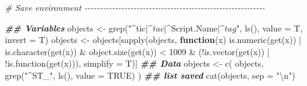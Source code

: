\documentclass[
  10pt,
  a4paper,oneside]{article}
\newenvironment{Shaded}{\begin{snugshade}}{\end{snugshade}}
\newcommand{\AttributeTok}[1]{\textcolor[rgb]{0.77,0.63,0.00}{#1}}
\newcommand{\CommentTok}[1]{\textcolor[rgb]{0.56,0.35,0.01}{\textit{#1}}}
\newcommand{\ConstantTok}[1]{\textcolor[rgb]{0.00,0.00,0.00}{#1}}
\newcommand{\ControlFlowTok}[1]{\textcolor[rgb]{0.13,0.29,0.53}{\textbf{#1}}}
\newcommand{\DecValTok}[1]{\textcolor[rgb]{0.00,0.00,0.81}{#1}}
\newcommand{\DocumentationTok}[1]{\textcolor[rgb]{0.56,0.35,0.01}{\textbf{\textit{#1}}}}
\newcommand{\FunctionTok}[1]{\textcolor[rgb]{0.00,0.00,0.00}{#1}}
\newcommand{\NormalTok}[1]{#1}
\newcommand{\OtherTok}[1]{\textcolor[rgb]{0.56,0.35,0.01}{#1}}
\newcommand{\SpecialCharTok}[1]{\textcolor[rgb]{0.00,0.00,0.00}{#1}}
\newcommand{\StringTok}[1]{\textcolor[rgb]{0.31,0.60,0.02}{#1}}
\begin{document}
\begin{Shaded}
\begin{Highlighting}[]
\CommentTok{\#  Save environment  {-}{-}{-}{-}{-}{-}{-}{-}{-}{-}{-}{-}{-}{-}{-}{-}{-}{-}{-}{-}{-}{-}{-}{-}{-}{-}{-}{-}{-}{-}{-}{-}{-}{-}{-}{-}{-}{-}{-}{-}{-}{-}{-}{-}{-}{-}{-}{-}{-}{-}{-}{-}{-}{-}{-}{-}{-}{-}{-}}

\DocumentationTok{\#\# Variables}
\NormalTok{objects }\OtherTok{\textless{}{-}} \FunctionTok{grep}\NormalTok{(}\StringTok{"\^{}tic$|\^{}tac$|\^{}Script.Name$|\^{}tag$"}\NormalTok{, }\FunctionTok{ls}\NormalTok{(), }\AttributeTok{value =}\NormalTok{ T, }\AttributeTok{invert =}\NormalTok{ T)}
\NormalTok{objects }\OtherTok{\textless{}{-}}\NormalTok{ objects[}\FunctionTok{sapply}\NormalTok{(objects, }\ControlFlowTok{function}\NormalTok{(x)}
    \FunctionTok{is.numeric}\NormalTok{(}\FunctionTok{get}\NormalTok{(x)) }\SpecialCharTok{|}
        \FunctionTok{is.character}\NormalTok{(}\FunctionTok{get}\NormalTok{(x)) }\SpecialCharTok{\&}
        \FunctionTok{object.size}\NormalTok{(}\FunctionTok{get}\NormalTok{(x)) }\SpecialCharTok{\textless{}} \DecValTok{1009} \SpecialCharTok{\&}
\NormalTok{        (}\SpecialCharTok{!}\FunctionTok{is.vector}\NormalTok{(}\FunctionTok{get}\NormalTok{(x)) }\SpecialCharTok{|}
             \SpecialCharTok{!}\FunctionTok{is.function}\NormalTok{(}\FunctionTok{get}\NormalTok{(x))), }\AttributeTok{simplify =}\NormalTok{ T)]}
\DocumentationTok{\#\# Data}
\NormalTok{objects }\OtherTok{\textless{}{-}} \FunctionTok{c}\NormalTok{(}
\NormalTok{    objects,}
    \FunctionTok{grep}\NormalTok{(}\StringTok{"\^{}ST\_"}\NormalTok{, }\FunctionTok{ls}\NormalTok{(), }\AttributeTok{value =} \ConstantTok{TRUE}\NormalTok{)}
\NormalTok{)}
\DocumentationTok{\#\# list saved}
\FunctionTok{cat}\NormalTok{(objects, }\AttributeTok{sep =} \StringTok{"}\SpecialCharTok{\textbackslash{}n}\StringTok{"}\NormalTok{)}
\end{Highlighting}
\end{Shaded}
\end{document}
